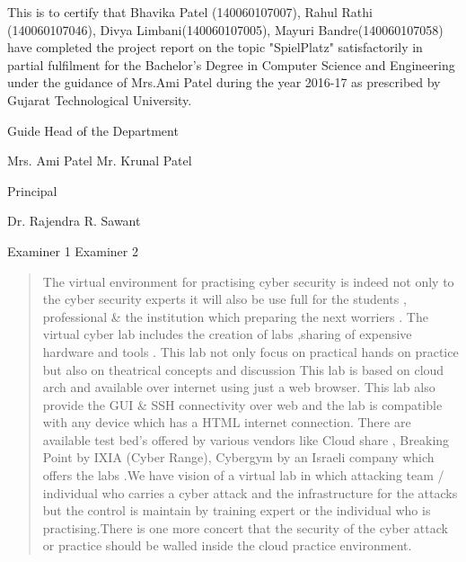 \documentclass[12pt,a4paper,final,oneside]{report}
\begin{document}
	This is to certify that Bhavika Patel (140060107007), Rahul Rathi (140060107046), Divya Limbani(140060107005), Mayuri Bandre(140060107058) have completed the project report on the topic "SpielPlatz" satisfactorily in partial fulfilment for the Bachelor's Degree in Computer Science and Engineering under the guidance of Mrs.Ami Patel during the year 2016-17 as prescribed by Gujarat Technological University.
	
\vspace{3cm}
	
	\begin{flushleft}
Guide \hfill Head of the Department\newline
		
		
		
		Mrs. Ami Patel \hfill Mr. Krunal Patel
	\end{flushleft}
	
	
	
	\vspace{2cm}
	\begin{center}
		Principal
		
		
		
		Dr. Rajendra R. Sawant
	\end{center}
	
	\vspace{2cm}
	\begin{flushleft}
		Examiner 1 \hfill Examiner 2
	\end{flushleft}
\newpage
\begin{abstract}
\par The virtual environment for practising cyber security is indeed not only to the cyber security experts it will also be use full for the students , professional \&
the institution which preparing the next worriers . The virtual cyber lab includes the creation of labs ,sharing of  expensive hardware and tools . This lab not 
only focus on practical hands on practice but also on theatrical concepts and discussion  This lab is based on cloud arch and available over internet using just a
web browser. This lab also provide the GUI \& SSH connectivity over web and the lab is compatible with any device which has a HTML%
internet connection. There are available test bed's offered by various vendors like Cloud share , Breaking Point by IXIA (Cyber Range), Cybergym by an Israeli company
which offers the labs .We have vision of a virtual lab in which attacking team / individual who carries a cyber attack and the infrastructure for the attacks but the 
control is maintain by training expert or the individual who is practising.There is one more concert that the security of the cyber attack or practice should be 
walled inside the cloud practice environment.


\end{abstract}
\end{document}

